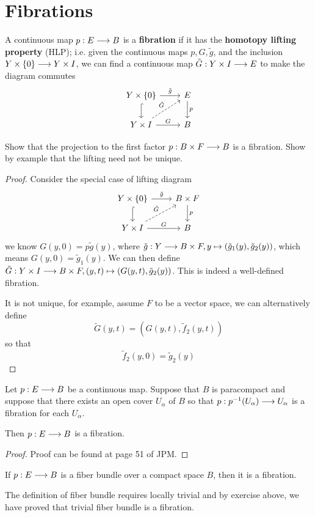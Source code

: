\documentclass[11pt]{book} %
\begin{document}
\section{Fibrations}
\begin{definition}
A continuous map $p: E\longrightarrow B$ is a \textbf{fibration} if it has the \textbf{homotopy lifting property} (HLP); i.e. given the continuous maps $p, G, \tilde{g}$, and the inclusion $Y\times \{0\}\longrightarrow Y\times I$, we can find a continuous map $\tilde{G}: Y\times I\longrightarrow E$ to make the diagram commutes
$$
\begin{tikzcd}
Y\times\{0\} \arrow[d, hook] \arrow[r, "\tilde{g}"] & E \arrow[d, "p"] \\
Y\times I \arrow[r, "G"] \arrow[ru, "\tilde{G}", dashed] & B
\end{tikzcd}
$$
\end{definition}
\begin{exr}
Show that the projection to the first factor $p : B \times F \longrightarrow B$ is a fibration. Show by example that the lifting need not be unique.
\end{exr}
\begin{proof}
Consider the special case of lifting diagram
$$
\begin{tikzcd}
Y\times\{0\} \arrow[d, hook] \arrow[r, "\tilde{g}"] & B\times F \arrow[d, "p"] \\
Y\times I \arrow[r, "G"] \arrow[ru, "\tilde{G}", dashed] & B
\end{tikzcd}
$$
we know $G(y,0)=p\tilde{g}(y)$, where $\tilde{g}: Y\longrightarrow B\times F, y\mapsto (\tilde{g}_1(y), \tilde{g}_2(y))$, which means $G(y,0)=\tilde{g}_{1}(y)$. We can then define $\tilde{G}: Y\times I\longrightarrow B\times F, (y,t)\mapsto (G(y,t), \tilde{g}_2(y))$. This is indeed a well-defined fibration.

It is not unique, for example, assume $F$ to be a vector space, we can alternatively define
$$
\tilde{G}(y,t)=(G(y,t), \tilde{f}_2(y,t))
$$
so that 
$$
\tilde{f}_2(y,0)=\tilde{g}_2(y)
$$
\end{proof}
\begin{theorem}
Let $p: E\longrightarrow B$ be a continuous map. Suppose that $B$ is paracompact and suppose that there exists an open cover $U_\alpha$ of $B$ so that $p: p^{-1}(U_\alpha)\longrightarrow U_\alpha$ is a fibration for each $U_\alpha$. 

Then $p: E\longrightarrow B$ is a fibration.
\end{theorem}
\begin{proof}
Proof can be found at page 51 of JPM.
\end{proof}
\begin{corollary}
If $p: E\longrightarrow B$ is a fiber bundle over a compact space $B$, then it is a fibration.
\end{corollary}
The definition of fiber bundle requires locally trivial and by exercise above, we have proved that trivial fiber bundle is a fibration.
\end{document}
